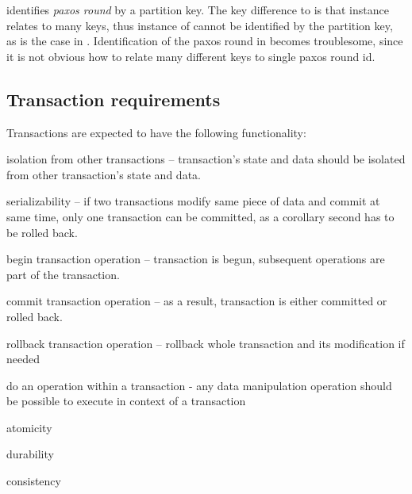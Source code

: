 \lwt identifies \emph{paxos round} by a partition key. The key difference to \lwt is that \mpt instance relates to many keys, thus instance of \mpt cannot be identified by the partition key, as is the case in \lwt. Identification of the paxos round in \mpt becomes troublesome, since it is not obvious how to relate many different keys to single paxos round id. \label{sec:mpp:requirements:identifyRound}





\subsection{Transaction requirements}
Transactions are expected to have the following functionality:

\begin{enumerate*}
\item isolation from other transactions -- transaction's state and data should be isolated from other transaction's state and data.
\item serializability -- if two transactions modify same piece of data and commit at same time, only one transaction can be committed, as a corollary second has to be rolled back.
\item begin transaction operation -- transaction is begun, subsequent operations are part of the transaction. 
\item commit transaction operation -- as a result, transaction is either committed or rolled back.
\item rollback transaction operation -- rollback whole transaction and its modification if needed
\item do an operation within a transaction - any data manipulation operation should be possible to execute in context of a transaction
\item atomicity
\item durability
\item consistency 
\end{enumerate*}

